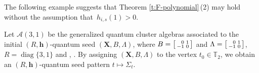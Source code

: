 \documentclass[pdftex]{sigma}
\numberwithin{equation}{section}
\begin{document}
The following example suggests that Theorem \ref{t:F-polynomial}\,(2) may hold without the assumption that~${h_{i,s}(1)>0}$.
\begin{Example}[type $G_{2}$]
Let $\mathcal{A}(3,1)$ be the generalized quantum cluster algebras associated to the initial $(R,\mathbf{h})$-quantum seed $(\mathbf{X},B,\Lambda)$, where
$B=\left[\begin{smallmatrix}
 \hphantom{-}0&1\\
 -1&0
\end{smallmatrix}\right]$ and $\Lambda=\left[\begin{smallmatrix}
 \hphantom{-}0&1\\
 -1&0
\end{smallmatrix}\right]$, $R=\operatorname{diag}\{3,1\}$ and ,
. By assigning $(\mathbf{X}, B,\Lambda)$ to the vertex $t_0\in \mathbb{T}_2$, we obtain an $(R,\mathbf{h})$-quantum seed pattern $t\mapsto \Sigma_t$.


\end{Example}
\end{document}
